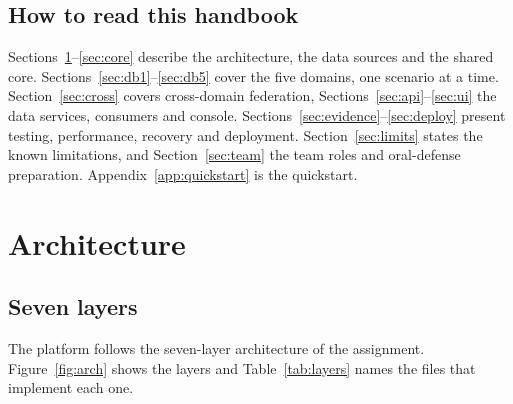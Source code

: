 \documentclass[11pt,a4paper]{article}
\begin{document}
\subsection{How to read this handbook}

Sections~\ref{sec:arch}--\ref{sec:core} describe the architecture, the data sources and the
shared core. Sections~\ref{sec:db1}--\ref{sec:db5} cover the five domains, one scenario at a
time. Section~\ref{sec:cross} covers cross-domain federation, Sections~\ref{sec:api}--\ref{sec:ui}
the data services, consumers and console. Sections~\ref{sec:evidence}--\ref{sec:deploy} present
testing, performance, recovery and deployment. Section~\ref{sec:limits} states the known
limitations, and Section~\ref{sec:team} the team roles and oral-defense preparation.
Appendix~\ref{app:quickstart} is the quickstart.

\section{Architecture}\label{sec:arch}

\subsection{Seven layers}

The platform follows the seven-layer architecture of the assignment. Figure~\ref{fig:arch}
shows the layers and Table~\ref{tab:layers} names the files that implement each one.
\end{document}

